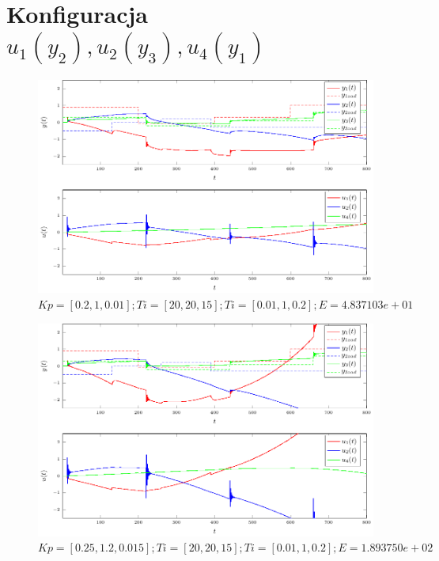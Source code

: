 \documentclass[a4paper,titlepage,11pt,twosides,floatssmall]{mwrep}
\begin{document}
\section*{Konfiguracja $u_1(y_2), u_2(y_3), u_4(y_1)$}



\begin{figure}[H]
	\centering
	\includegraphics[scale=1]{../wykresy/zad4_pid_4_1.pdf}
	\caption{$Kp = [0.2, 1, 0.01]; Ti = [20, 20, 15]; Ti = [0.01, 1, 0.2]; E = 4.837103e+01$}
\end{figure}

\begin{figure}[H]
	\centering
	\includegraphics[scale=1]{../wykresy/zad4_pid_4_2.pdf}
	\caption{$Kp = [0.25, 1.2, 0.015]; Ti = [20, 20, 15]; Ti = [0.01, 1, 0.2]; E = 1.893750e+02$}
\end{figure}
\end{document}
